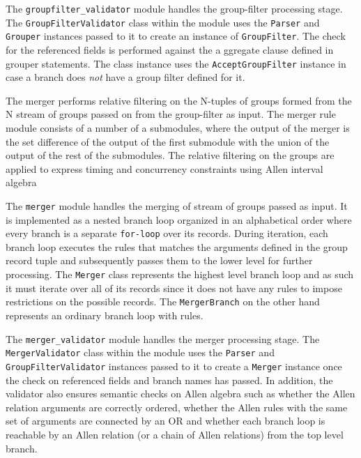 The \texttt{groupfilter\_validator} module handles the group-filter processing
stage. The \texttt{GroupFilterValidator} class within the module uses the
\texttt{Parser} and \texttt{Grouper} instances passed to it to create an
instance of \texttt{GroupFilter}.  The check
for the referenced fields is performed against the a ggregate clause defined
in grouper statements. The class instance uses the \texttt{AcceptGroupFilter}
instance in case a branch does \emph{not} have a group filter defined for it.

The merger performs relative filtering on the N-tuples of groups formed from
the N stream of groups passed on from the group-filter as input. The merger
rule module consists of a number of a submodules, where the output of the
 merger is the set difference of the output of the first submodule with the
union of the output of the rest of the submodules. The relative filtering on
the groups are applied to express timing and concurrency constraints using
Allen interval algebra \cite{fallen:1983}

The \texttt{merger} module handles the merging of stream of groups passed as
input. It is implemented as a nested branch loop organized in an alphabetical
order where every branch is a separate \texttt{for-loop} over its records.
During iteration, each branch loop executes the rules that matches the
arguments defined in the  group record tuple
and subsequently passes them to the lower level for further processing. The
\texttt{Merger} class represents the highest level branch loop and as such it
must iterate over all of its records since it does not have any rules to
impose restrictions on the possible records. The \texttt{MergerBranch} on the
other hand represents an ordinary branch loop with rules.

The \texttt{merger\_validator} module handles the merger processing stage.
The \texttt{MergerValidator} class within the module uses the \texttt{Parser}
and \texttt{GroupFilterValidator} instances passed to it to create a
\texttt{Merger} instance once the check on referenced fields and branch names
has passed. In addition,  the validator also
ensures semantic checks on Allen algebra such as whether the Allen relation
arguments are correctly ordered, whether the Allen rules with the same set of
arguments are connected by an OR and whether each branch loop is reachable by
an Allen relation (or a chain of Allen relations) from the top level branch.

